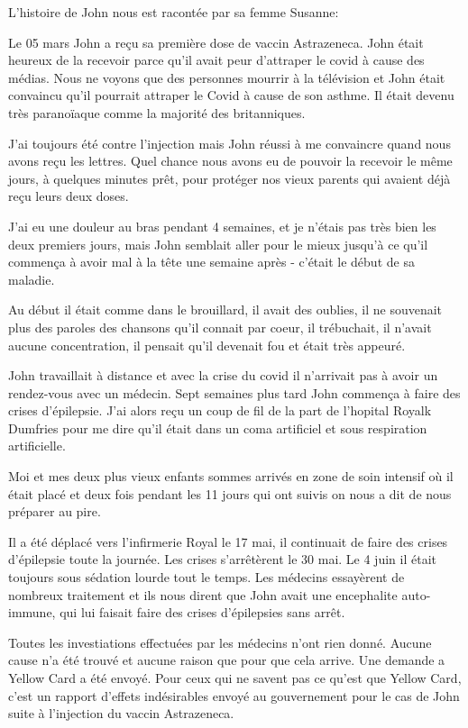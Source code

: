 L'histoire de John nous est racontée par sa femme Susanne:

Le 05 mars John a reçu sa première dose de vaccin Astrazeneca. John était
heureux de la recevoir parce qu'il avait peur d'attraper le covid à cause des
médias. Nous ne voyons que des personnes mourrir à la télévision et John était
convaincu qu'il pourrait attraper le Covid à cause de son asthme. Il était
devenu très paranoïaque comme la majorité des britanniques.

J'ai toujours été contre l'injection mais John réussi à me convaincre quand nous
avons reçu les lettres. Quel chance nous avons eu de pouvoir la recevoir le même
jours, à quelques minutes prêt, pour protéger nos vieux parents qui avaient déjà
reçu leurs deux doses.

J'ai eu une douleur au bras pendant 4 semaines, et je n'étais pas très bien les
deux premiers jours, mais John semblait aller pour le mieux jusqu'à ce qu'il
commença à avoir mal à la tête une semaine après - c'était le début de sa
maladie.

Au début il était comme dans le brouillard, il avait des oublies, il ne
souvenait plus des paroles des chansons qu'il connait par coeur, il trébuchait,
il n'avait aucune concentration, il pensait qu'il devenait fou et était très
appeuré.

John travaillait à distance et avec la crise du covid il n'arrivait pas à avoir
un rendez-vous avec un médecin. Sept semaines plus tard John commença à faire
des crises d'épilepsie. J'ai alors reçu un coup de fil de la part de l'hopital
Royalk Dumfries pour me dire qu'il était dans un coma artificiel et sous
respiration artificielle.

Moi et mes deux plus vieux enfants sommes arrivés en zone de soin intensif où il
était placé et deux fois pendant les 11 jours qui ont suivis on nous a dit de
nous préparer au pire.

Il a été déplacé vers l'infirmerie Royal le 17 mai, il continuait de faire des
crises d'épilepsie toute la journée. Les crises s'arrêtèrent le 30 mai. Le 4
juin il était toujours sous sédation lourde tout le temps. Les médecins
essayèrent de nombreux traitement et ils nous dirent que John avait une
encephalite auto-immune, qui lui faisait faire des crises d'épilepsies sans
arrêt.

Toutes les investiations effectuées par les médecins n'ont rien donné. Aucune
cause n'a été trouvé et aucune raison que pour que cela arrive. Une demande a
Yellow Card a été envoyé. Pour ceux qui ne savent pas ce qu'est que Yellow Card,
c'est un rapport d'effets indésirables envoyé au gouvernement pour le cas de
John suite à l'injection du vaccin Astrazeneca.

